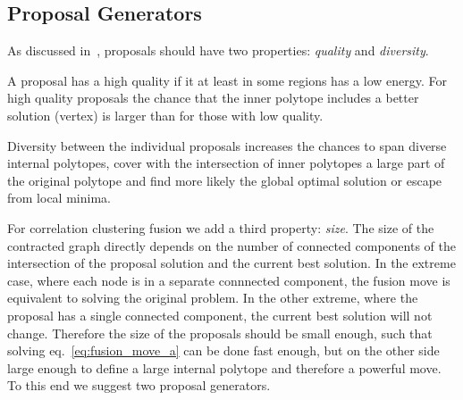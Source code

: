 \documentclass[10pt,twocolumn,letterpaper]{article}
\newtheorem{remark}{Remark}
\theoremstyle{definition}
\newcommand{\OR}{\textrm{ or }}
\begin{document}




\subsection{Proposal Generators}

As discussed in~\cite{Lempitsky-2010}, proposals
should have two properties: \emph{quality} 
and \emph{diversity}.

A proposal has a high quality if it at least in some regions has a low energy.
For high quality proposals the chance that the inner polytope includes a
better solution (vertex) is larger than for those with low quality.

Diversity between the individual proposals increases the chances
to span diverse internal polytopes, cover with the intersection of
inner polytopes a large part of the original polytope and find 
more likely the global optimal solution or escape from local minima.

For correlation clustering fusion we add a third
property: \emph{size}.
The size of the contracted graph directly
depends on the number of connected components
of the intersection of the proposal solution and the current best solution.
%
In the extreme case, where each 
node is in a separate connnected component,
the fusion move is equivalent to solving the original problem.
In the other extreme, where the proposal has 
a single connected component, the current best solution will not change.
% 
Therefore the size of the proposals
should be small enough, such that solving
eq.~\ref{eq:fusion_move_a} can
be done fast enough, but  on the other side 
large enough to define a large internal polytope and therefore a powerful move.
%
To this end we suggest two proposal generators.
\end{document}

